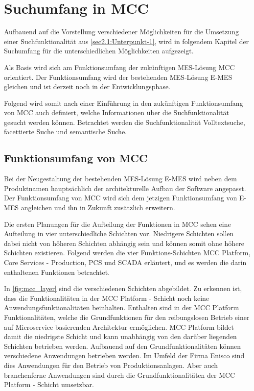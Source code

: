 \chapter{Suchumfang in MCC\label{chap3:Drittes-Kapitel}}

Aufbauend auf die Vorstellung verschiedener Möglichkeiten für die Umsetzung einer Suchfunktionalität aus \autoref{sec2.1:Unterpunkt-1}, wird in folgendem Kapitel der Suchumfang für die unterschiedlichen Möglichkeiten aufgezeigt.

Als Basis wird sich am Funktionsumfang der zukünftigen MES-Lösung \glqq MCC\grqq{} orientiert. Der Funktionsumfang wird der bestehenden MES-Lösung \glqq E-MES\grqq{} gleichen und ist derzeit noch in der Entwicklungsphase.

Folgend wird somit nach einer Einführung in den zukünftigen Funktionsumfang von \glqq MCC\grqq{} auch definiert, welche Informationen über die Suchfunktionalität gesucht werden können. Betrachtet werden die Suchfunktionalität \glqq Volltextsuche\grqq{}, \glqq facettierte Suche\grqq{} und \glqq semantische Suche\grqq{}.

\section{Funktionsumfang von MCC\label{sec3.1:Unterunterpunkt-1}}

Bei der Neugestaltung der bestehenden MES-Lösung \glqq E-MES\grqq{} wird neben dem Produktnamen hauptsächlich der architekturelle Aufbau der Software angepasst. Der Funktionsumfang von \glqq MCC\grqq{} wird sich dem jetzigen Funktionsumfang von \glqq E-MES\grqq{} angleichen und ihn in Zukunft zusätzlich erweitern.

Die ersten Planungen für die Aufteilung der Funktionen in \glqq MCC\grqq{} sehen eine Aufteilung in vier unterschiedliche Schichten vor. Niedrigere Schichten sollen dabei nicht von höheren Schichten abhängig sein und können somit ohne höhere Schichten existieren. Folgend werden die vier Funktions-Schichten \glqq MCC Platform\grqq{}, \glqq Core Services - Production\grqq{}, \glqq PCS\grqq{} und \glqq SCADA\grqq{} erläutert, und es werden die darin enthaltenen Funktionen betrachtet.

In \autoref{fig:mcc_layer} sind die verschiedenen Schichten abgebildet. Zu erkennen ist, dass die Funktionalitäten in der \glqq MCC Platform\grqq{} - Schicht noch keine Anwendungsfunktionalitäten beinhalten. Enthalten sind in der \glqq MCC Platform\grqq{} Funktionalitäten, welche die Grundfunktionen für den reibungslosen Betrieb einer auf Microservice basierenden Architektur ermöglichen. \glqq MCC Platform\grqq{} bildet damit die niedrigste Schicht und kann unabhängig von den darüber liegenden Schichten betrieben werden. Aufbauend auf den Grundfunktionalitäten können verschiedene Anwendungen betrieben werden. Im Umfeld der Firma Enisco sind dies Anwendungen für den Betrieb von Produktionsanlagen. Aber auch branchenferne Anwendungen sind durch die Grundfunktionalitäten der \glqq MCC Platform\grqq{} - Schicht umsetzbar.

